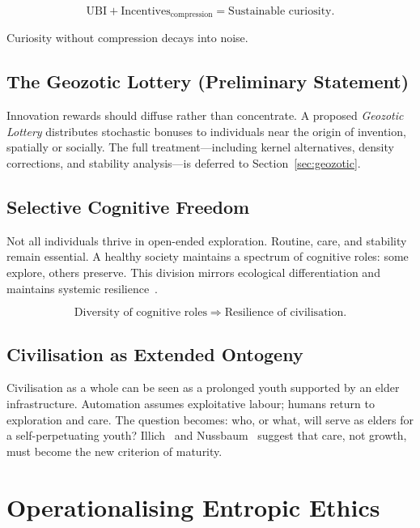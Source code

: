 \documentclass[12pt,a4paper]{article}
\theoremstyle{definition}
\begin{document}
\begin{equation}
  \text{UBI} + \text{Incentives}_{\mathrm{compression}}
  = \text{Sustainable curiosity.}
\end{equation}

Curiosity without compression decays into noise.

\subsection{The Geozotic Lottery (Preliminary Statement)}

Innovation rewards should diffuse rather than concentrate.  A proposed
\emph{Geozotic Lottery} distributes stochastic bonuses to individuals near the
origin of invention, spatially or socially.  The full treatment---including
kernel alternatives, density corrections, and stability analysis---is deferred
to Section~\ref{sec:geozotic}.

\subsection{Selective Cognitive Freedom}

Not all individuals thrive in open-ended exploration.  Routine, care, and
stability remain essential.  A healthy society maintains a spectrum of cognitive
roles: some explore, others preserve.  This division mirrors ecological
differentiation and maintains systemic
resilience~\citep{capraluisi2021,dalziel2022}.

\begin{equation}
  \text{Diversity of cognitive roles}
  \;\Longrightarrow\;
  \text{Resilience of civilisation.}
\end{equation}

\subsection{Civilisation as Extended Ontogeny}

Civilisation as a whole can be seen as a prolonged youth supported by an elder
infrastructure.  Automation assumes exploitative labour; humans return to
exploration and care.  The question becomes: who, or what, will serve as elders
for a self-perpetuating youth?  Illich~\citeyearpar{illich1973} and
Nussbaum~\citeyearpar{nussbaum2019} suggest that care, not growth, must become
the new criterion of maturity.

\section{Operationalising Entropic Ethics}
\end{document}
